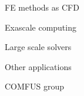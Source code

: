 FE methods as CFD

Exascale computing

Large scale solvers

Other applications 

COMFUS group


%
%

